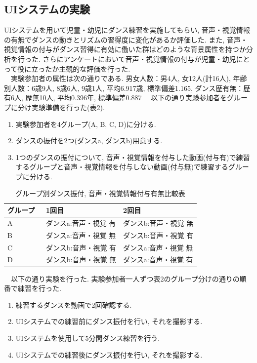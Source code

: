 \documentclass[technicalreport]{ieicej}
\begin{document}
\subsection{UIシステムの実験}
UIシステムを用いて児童・幼児にダンス練習を実施してもらい, 音声・視覚情報の有無でダンスの動きとリズムの習得度に変化があるか評価した. また, 音声・視覚情報の付与がダンス習得に有効に働いた群はどのような背景属性を持つか分析を行った. さらにアンケートにおいて音声・視覚情報の付与が児童・幼児にとって役に立ったか主観的な評価を行った. \\
　実験参加者の属性は次の通りである. 男女人数：男4人, 女12人(計16人), 年齢別人数：6歳9人, 8歳6人, 9歳1人, 平均6.917歳, 標準偏差1.165, ダンス歴有無：歴有6人, 歴無10人, 平均0.396年, 標準偏差0.887
　以下の通り実験参加者をグループに分け実験準備を行った(表2).
\begin{enumerate}[label=\arabic*., nosep]
  \item 実験参加者を4グループ(A, B, C, D)に分ける. 
  \item ダンスの振付を2つ(ダンスa, ダンスb)用意する. 
  \item 1つのダンスの振付について, 音声・視覚情報を付与した動画(付与有)で練習するグループと音声・視覚情報を付与しない動画(付与無)で練習するグループに分ける. 
\end{enumerate}
\begin{table}[t]
  \centering
  \caption{グループ別ダンス振付, 音声・視覚情報付与有無比較表}
  \begin{tabularx}{\linewidth}{l p{0.4\linewidth} p{0.4\linewidth}}
    \toprule
      グループ & 1回目 & 2回目 \\
    \midrule
      A & ダンスa:音声・視覚 有 & ダンスb:音声・視覚 無 \\
      B & ダンスa:音声・視覚 無 & ダンスb:音声・視覚 有 \\
      C & ダンスb:音声・視覚 有 & ダンスa:音声・視覚 無 \\
      D & ダンスb:音声・視覚 無 & ダンスa:音声・視覚 有 \\
    \bottomrule
  \end{tabularx}
\end{table}
　以下の通り実験を行った. 実験参加者一人ずつ表2のグループ分けの通りの順番で練習を行った.
\begin{enumerate}[label=\arabic*., nosep]
  \item 練習するダンスを動画で2回確認する.  
  \item UIシステムでの練習前にダンス振付を行い, それを撮影する.
  \item UIシステムを使用して5分間ダンス練習を行う. 
  \item UIシステムでの練習後にダンス振付を行い, それを撮影する.
\end{enumerate}
\end{document}
